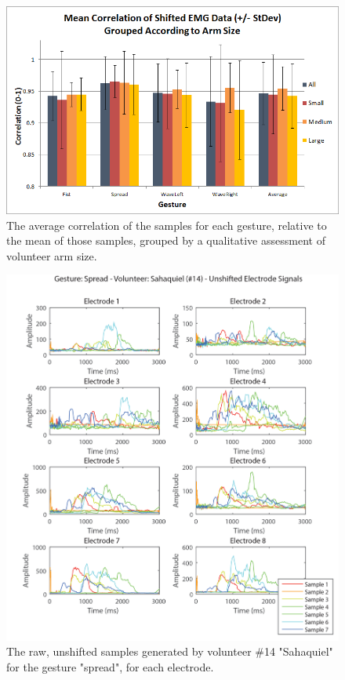 \documentclass[journal]{IEEEtran}
\begin{document}
    \begin{figure}[H]
    \centering
    \includegraphics[width=1\columnwidth]{EMG/Correlation_Grouped}
    \caption{The average correlation of the samples for each gesture, relative to the mean of those samples, grouped by a qualitative assessment of volunteer arm size.}
    \label{Correlation_Grouped}
    \end{figure}

    \begin{figure}[p]
    \centering
    \includegraphics[width=1\columnwidth]{EMG/Spread_Min_Sahaquiel_Unshifted}
    \caption{The raw, unshifted samples generated by volunteer \#14 "Sahaquiel" for the gesture "spread", for each electrode.}
    \label{Spread_Min_Sahaquiel_Unshifted}
    \end{figure}
    
\end{document}
